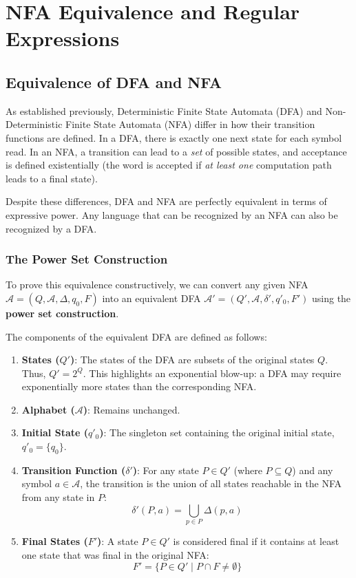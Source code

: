 \chapter{NFA Equivalence and Regular Expressions}

\section{Equivalence of DFA and NFA}

As established previously, Deterministic Finite State Automata (DFA) and Non-Deterministic Finite State Automata (NFA) differ in how their transition functions are defined. In a DFA, there is exactly one next state for each symbol read. In an NFA, a transition can lead to a \emph{set} of possible states, and acceptance is defined existentially (the word is accepted if \emph{at least one} computation path leads to a final state).

Despite these differences, DFA and NFA are perfectly equivalent in terms of expressive power. Any language that can be recognized by an NFA can also be recognized by a DFA. 

\subsection{The Power Set Construction}

To prove this equivalence constructively, we can convert any given NFA $\mathcal{A} = (Q, \mathcal{A}, \Delta, q_0, F)$ into an equivalent DFA $\mathcal{A}' = (Q', \mathcal{A}, \delta', q'_0, F')$ using the \textbf{power set construction}.

The components of the equivalent DFA are defined as follows:
\begin{enumerate}
\item \textbf{States ($Q'$)}: The states of the DFA are subsets of the original states $Q$. Thus, $Q' = 2^Q$. This highlights an exponential blow-up: a DFA may require exponentially more states than the corresponding NFA.
\item \textbf{Alphabet ($\mathcal{A}$)}: Remains unchanged.
\item \textbf{Initial State ($q'_0$)}: The singleton set containing the original initial state, $q'_0 = \{q_0\}$.
\item \textbf{Transition Function ($\delta'$)}: For any state $P \in Q'$ (where $P \subseteq Q$) and any symbol $a \in \mathcal{A}$, the transition is the union of all states reachable in the NFA from any state in $P$:
$$ \delta'(P, a) = \bigcup_{p \in P} \Delta(p, a) $$
\item \textbf{Final States ($F'$)}: A state $P \in Q'$ is considered final if it contains at least one state that was final in the original NFA:
$$ F' = \{ P \in Q' \mid P \cap F \neq \emptyset \} $$
\end{enumerate}

